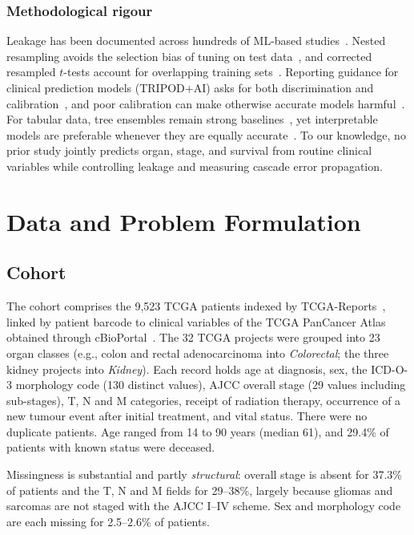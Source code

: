 \documentclass[conference]{IEEEtran}
\begin{document}
\subsubsection*{Methodological rigour}
Leakage has been documented across hundreds of ML-based studies~\cite{kapoor2023}. Nested resampling avoids the selection bias of tuning on test data~\cite{cawley2010}, and corrected resampled $t$-tests account for overlapping training sets~\cite{nadeau2003}. Reporting guidance for clinical prediction models (TRIPOD+AI) asks for both discrimination and calibration~\cite{collins2024}, and poor calibration can make otherwise accurate models harmful~\cite{vancalster2019}. For tabular data, tree ensembles remain strong baselines~\cite{grinsztajn2022}, yet interpretable models are preferable whenever they are equally accurate~\cite{rudin2019}. To our knowledge, no prior study jointly predicts organ, stage, and survival from routine clinical variables while controlling leakage and measuring cascade error propagation.

\section{Data and Problem Formulation}
\subsection{Cohort}
The cohort comprises the 9,523 TCGA patients indexed by TCGA-Reports~\cite{kefeli2024}, linked by patient barcode to clinical variables of the TCGA PanCancer Atlas obtained through cBioPortal~\cite{cerami2012}. The 32 TCGA projects were grouped into 23 organ classes (e.g., colon and rectal adenocarcinoma into \emph{Colorectal}; the three kidney projects into \emph{Kidney}). Each record holds age at diagnosis, sex, the ICD-O-3 morphology code (130 distinct values), AJCC overall stage (29 values including sub-stages), T, N and M categories, receipt of radiation therapy, occurrence of a new tumour event after initial treatment, and vital status. There were no duplicate patients. Age ranged from 14 to 90 years (median 61), and 29.4\% of patients with known status were deceased.

Missingness is substantial and partly \emph{structural}: overall stage is absent for 37.3\% of patients and the T, N and M fields for 29--38\%, largely because gliomas and sarcomas are not staged with the AJCC I--IV scheme. Sex and morphology code are each missing for 2.5--2.6\% of patients.
\end{document}
